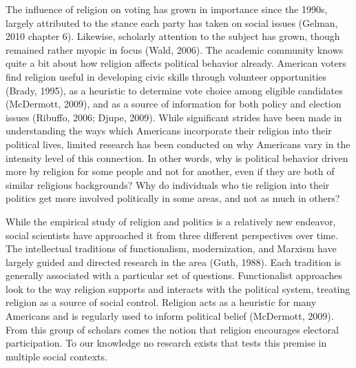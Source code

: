 \documentclass{article}
\begin{document}
The influence of religion on voting has grown in importance since the 1990s, largely attributed to the stance each party has taken on social issues (Gelman, 2010 chapter 6).  Likewise, scholarly attention to the subject has grown, though remained rather myopic in focus (Wald, 2006).  The academic community knows quite a bit about how religion affects political behavior already.  American voters find religion useful in developing civic skills through volunteer opportunities (Brady, 1995), as a heuristic to determine vote choice among eligible candidates (McDermott, 2009), and as a source of information for both policy and election issues (Ribuffo, 2006; Djupe, 2009). While significant strides have been made in understanding the ways which Americans incorporate their religion into their political lives, limited research has been conducted on why Americans vary in the intensity level of this connection.  In other words, why is political behavior driven more by religion for some people and not for another, even if they are both of similar religious backgrounds?  Why do individuals who tie religion into their politics get more involved politically in some areas, and not as much in others?

While the empirical study of religion and politics is a relatively new endeavor, social scientists have approached it from three different perspectives over time.  The intellectual traditions of functionalism, modernization, and Marxism have largely guided and directed research in the area (Guth, 1988).  Each tradition is generally associated with a particular set of questions.  Functionalist approaches look to the way religion supports and interacts with the political system, treating religion as a source of social control.  Religion acts as a heuristic for many Americans and is regularly used to inform political belief (McDermott, 2009).  From this group of scholars comes the notion that religion encourages electoral participation.  To our knowledge no research exists that tests this premise in multiple social contexts.
\end{document}
